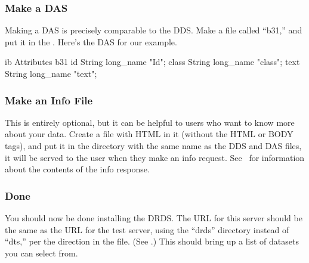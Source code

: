 \documentclass{dods-book}
\begin{document}
\subsubsection{Make a DAS}

Making a DAS is precisely comparable to the DDS.  Make a file called
``b31,'' and put it in the .  Here's the DAS for
our example.

\begin{vcode}{ib}
Attributes {
  b31 {
    id {
      String long_name "Id";
    }
    class {
      String long_name "class";
    }
    text {
      String long_name "text";
    }
  }
}
\end{vcode}                  


\subsubsection{Make an Info File}

This is entirely optional, but it can be helpful to users who want to
know more about your data.  Create a file with HTML in it
(without the HTML or BODY tags), and put it in the
 directory with the same name as the DDS and DAS
files, it will be served to the user when they make an info request.
See \DODSquick\ for information about the contents of the info
response. 


\subsubsection{Done}
\label{server,drds,done}

You should now be done installing the DRDS.  The URL for this server
should be the same as the URL for the test server, using the ``drds''
directory instead of ``dts,'' per the  direction
in the  file.  (See .)
This should bring up a list of datasets you can select from.
\end{document}

